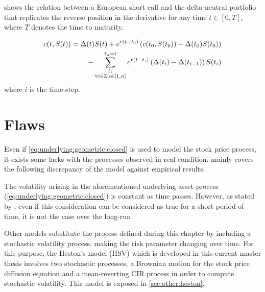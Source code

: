 \documentclass[12pt,a4paper]{report}
\begin{document}
 shows the relation between a European short call and the delta-neutral portfolio that replicates the reverse position in the derivative for any time $t \in [0, T]$, where $T$ denotes the time to maturity.

\begin{align}
  c(t, S(t)) = \Delta(t) S(t) + 
  e^{r (t - t_0)} \left( c(t_0, S(t_0))  - \Delta(t_{0}) S(t_0) \right)
  \notag\\
    \mspace{5mu}
  - \sum_{\substack{t_i \\ \forall i \in \mathbb{Z} : i \in \left [1, n \right ]}}^{t_n = t} e^{r (t - t_i)} \left( \Delta(t_{i}) -  \Delta(t_{i-1}) \right) S(t_i)
  \label{eq:bsm:delta:reverse:portfolio} 
\end{align}
where $i$ is the time-step.
























\section{Flaws}
\label{sec:Flaws}


Even if \cref{eq:underlying:geometric:closed} is used to model the stock price process, it exists some lacks with the processes observed in real condition. 
 mainly covers the following discrepancy of the model against empirical results.
  
The volatility arising in the aforementioned underlying asset process (\ref{eq:underlying:geometric:closed}) is constant as time passes. However, as stated by \citet{teneng2011limitations}, even if this consideration can be considered as true for a short period of time, it is not the case over the long-run 

Other models substitute the process defined during this chapter by including a stochastic volatility process, making the risk parameter changing over time.
For this purpose, the Heston's model (HSV) which is developed in this current master thesis involves two stochastic processes, a Brownian motion for the stock price diffusion equation and a mean-reverting CIR process in order to compute stochastic volatility.
This model is exposed in \cref{sec:other:heston}.
\end{document}
